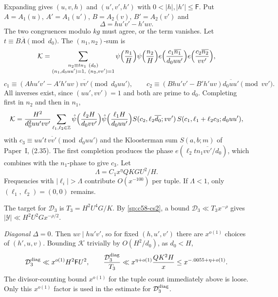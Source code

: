 Expanding gives $(u,v,h)$ and $(u',v',h')$ with $0<|h|,|h'|\le\mathsf F$. Put
$A=A_1(u)$, $A'=A_1(u')$, $B=A_2(v)$, $B'=A_2(v')$ and
\[
 \Delta=hu'v'-h'uv .
\]
The two congruences modulo $kg$ must agree, or the term vanishes. Let
$t\equiv B\overline A\pmod{d_0}$. The $(n_1,n_2)$-sum is
\[
 \mathcal K=\sum_{\substack{n_2\equiv tn_1\ (d_0)\\(n_1,d_0uu')=1,\ (n_2,vv')=1}}
 \psi\Bigl(\frac{n_1}H\Bigr)\psi\Bigl(\frac{n_2}H\Bigr)
 e\Bigl(\frac{c_1\overline{n_1}}{d_0uu'}\Bigr)e\Bigl(\frac{c_2\overline{n_2}}{vv'}\Bigr),
\]
\[
 c_1\equiv(Ahu'v'-A'h'uv)\overline{vv'}\pmod{d_0uu'},\qquad
 c_2\equiv(Bhu'v'-B'h'uv)\overline{d_0uu'}\pmod{vv'}.
\]
All inverses exist, since $(uu',vv')=1$ and both are prime to $d_0$.
Completing first in $n_2$ and then in $n_1$,
\begin{equation}\label{sp:P2}
 \mathcal K=\frac{H^2}{d_0^2uu'vv'}\sum_{\ell_1,\ell_2\in\mathbb Z}
 \hat\psi\Bigl(\frac{\ell_2H}{d_0vv'}\Bigr)\hat\psi\Bigl(\frac{\ell_1H}{d_0uu'}\Bigr)
 S(c_2,\ell_2\overline{d_0};vv')\,S(c_1,\ell_1+\ell_2c_3;d_0uu'),
\end{equation}
with $c_3\equiv uu't\,\overline{vv'}\pmod{d_0uu'}$ and the Kloosterman sum
$S(a,b;m)$ of Paper~I, (2.35). The first completion produces the phase
$e(\ell_2tn_1\overline{vv'}/d_0)$, which combines with the $n_1$-phase to
give $c_3$. Let
\begin{equation}\label{sp:dual}
 \Lambda=C_1x^{\eta}QKGU^2/H .
\end{equation}
Frequencies with $|\ell_i|>\Lambda$ contribute $O(x^{-100})$ per tuple. If
$\Lambda<1$, only $(\ell_1,\ell_2)=(0,0)$ remains.

The target for $\mathcal D_3$ is $T_3=H^2U^4G/K$. By \eqref{sp:c58-cs2}, a
bound $\mathcal D_3\ll T_3x^{-\rho}$ gives $|\mathcal Y|\ll H^2U^2Gx^{-\rho/2}$.

\emph{Diagonal $\Delta=0$.} Then $uv\mid hu'v'$, so for fixed $(h,u',v')$
there are $x^{o(1)}$ choices of $(h',u,v)$. Bounding $\mathcal K$ trivially
by $O(H^2/d_0)$, as $d_0<H$,
\[
 \mathcal D_3^{\rm diag}\ll x^{o(1)}H^2\mathsf FU^2,\qquad
 \frac{\mathcal D_3^{\rm diag}}{T_3}\ll x^{\eta+o(1)}\frac{QK^2H}x\le x^{-.0055+\eta+o(1)}.
\]
The divisor-counting bound $x^{o(1)}$ for the tuple count immediately above is
loose. Only this $x^{o(1)}$ factor is used in the estimate for
$\mathcal D_3^{\rm diag}$.

